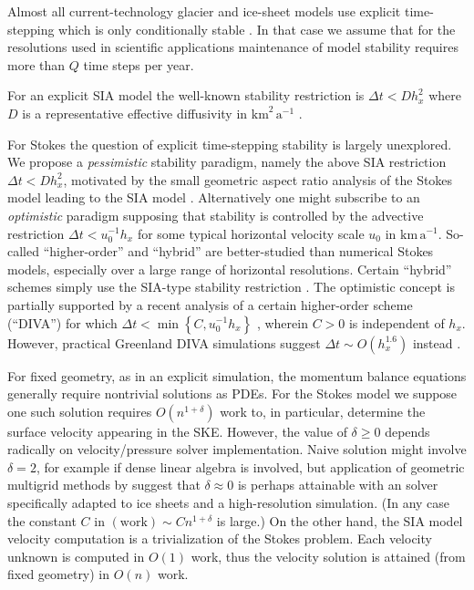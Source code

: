 \documentclass[twocolumn,letterpaper]{igs}
\begin{document}
Almost all current-technology glacier and ice-sheet models use explicit time-stepping which is only conditionally stable \citep[for example]{LeVeque2007}.  In that case we assume that for the resolutions used in scientific applications maintenance of model stability requires more than $Q$ time steps per year.

For an explicit SIA model the well-known stability restriction is $\Delta t < D h_x^2$ where $D$ is a representative effective diffusivity in $\text{km}^2\,\text{a}^{-1}$ \citep{Bueleretal2005,Robinsonetal2022}.

For Stokes the question of explicit time-stepping stability is largely unexplored.  We propose a \emph{pessimistic} stability paradigm, namely the above SIA restriction $\Delta t < D h_x^2$, motivated by the small geometric aspect ratio analysis of the Stokes model leading to the SIA model \citep{GreveBlatter2009}.  Alternatively one might subscribe to an \emph{optimistic} paradigm supposing that stability is controlled by the advective restriction $\Delta t < u_0^{-1} h_x$ for some typical horizontal velocity scale $u_0$ in $\text{km}\,\text{a}^{-1}$.  So-called ``higher-order'' and ``hybrid'' are better-studied than numerical Stokes models, especially over a large range of horizontal resolutions.  Certain ``hybrid'' schemes simply use the SIA-type stability restriction \citep{Winkelmannetal2011}.  The optimistic concept is partially supported by a recent analysis of a certain higher-order scheme (``DIVA'') for which $\Delta t < \min\left\{C,u_0^{-1} h_x\right\}$ \citep[equations (52) and (56)]{Robinsonetal2022}, wherein $C>0$ is independent of $h_x$.  However, practical Greenland DIVA simulations suggest $\Delta t \sim O(h_x^{1.6})$ instead \citep[Figure 3(a)]{Robinsonetal2022}.

For fixed geometry, as in an explicit simulation, the momentum balance equations generally require nontrivial solutions as PDEs.  For the Stokes model we suppose one such solution requires $O(n^{1+\delta})$ work to, in particular, determine the surface velocity appearing in the SKE.  However, the value of $\delta \ge 0$ depends radically on velocity/pressure solver implementation.  Naive solution might involve $\delta=2$, for example if dense linear algebra is involved, but application of geometric multigrid methods by \cite{IsaacStadlerGhattas2015} suggest that $\delta \approx 0$ is perhaps attainable with an solver specifically adapted to ice sheets and a high-resolution simulation.  (In any case the constant $C$ in $(\text{work}) \sim C n^{1+\delta}$ is large.)  On the other hand, the SIA model velocity computation is a trivialization of the Stokes problem.  Each velocity unknown is computed in $O(1)$ work, thus the velocity solution is attained (from fixed geometry) in $O(n)$ work.
\end{document}
